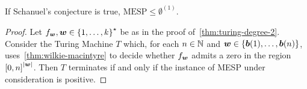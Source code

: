 \begin{theorem}
If Schanuel's conjecture is true, $\mbox{MESP} \leq \emptyset^{(1)}$.
\end{theorem}

\begin{proof}
Let $f_{\boldsymbol{w}}, \boldsymbol{w} \in {\lbrace 1, \ldots, k \rbrace}^{\star}$ be as in the proof of~\cref{thm:turing-degree-2}.
Consider the Turing Machine $T$ which, for each $n \in \mathbb{N}$ and $\boldsymbol{w} \in \lbrace \boldsymbol{b}(1), \ldots, \boldsymbol{b}(n) \rbrace$, uses~\cref{thm:wilkie-macintyre} to decide whether $f_{\boldsymbol{w}}$ admits a zero in the region ${[0,n]}^{\lvert \boldsymbol{w} \rvert}$.
Then $T$ terminates if and only if the instance of MESP under consideration is positive.
\end{proof}
